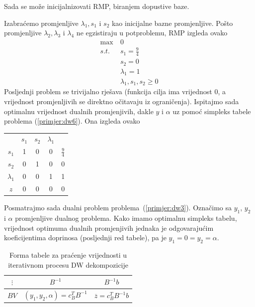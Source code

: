 \documentclass[a4paper, utf8, 11pt, colorlinks]{book}
\theoremstyle{definition}
\begin{document}
Sada se može inicijalnizovati RMP, biranjem dopustive baze.

Izabraćemo promjenljive $\lambda_1, s_1$ i $s_2$ kao inicijalne bazne promjenljive. Pošto  promjenljive $\lambda_2,\lambda_3$ i $\lambda_4$ ne egzistiraju u potproblemu,  RMP izgleda ovako
      \begin{equation}
	\begin{aligned}\label{primjer:dw6}
		\max\  & 0\\
		s.t.\  &s_1=\frac 94\\
		&s_2=0\\
		&\lambda_1 = 1\\
		&\lambda_1,s_1,s_2\geqslant 0
	\end{aligned}
\end{equation}
Posljednji problem se trivijalno rješava (funkcija cilja ima vrijednost 0, a vrijednost promjenljivih se direktno očitavaju iz ograničenja). Ispitajmo sada optimalnu vrijednost dualnih promjenjivih, dakle $y$ i $\alpha$ uz pomoć simpleks tabele problema (\ref{primjer:dw6}). Ona izgleda ovako
\begin{center}

\begin{tabular}{c|cccc}
	       &$s_1$  & $ s_2$   & $\lambda_1$ &  \\
 $s_1$	   &  1  &   0      &   0         &  $\frac{9}{4}$ \\
  $s_2$	  &  0  &    1     &   0         &  0             \\
$\lambda_1$	  &  0  &    0     &   1         &  1   \\ \hline
	$z$   & 0  &    0     &   0         &  0
\end{tabular}
\end{center}
 
Posmatrajmo sada dualni problem problema~(\ref{primjer:dw3}). Označimo sa $y_1$, $y_2$ i $\alpha$ promjenljive dualnog problema. Kako imamo optimalnu simpleks tabelu, vrijednost optimuma dualnih promjenjivih jednaka je odgovarajućim koeficijentima doprinosa (posljednji red tabele), pa je $y_1 = 0 = y_2 = \alpha$. 

\begin{table}\centering
	\begin{tabular}{|c|c|c|} \hline
	$\vdots$ & 	$B^{-1}$& $B^{-1}b$ \\
	\hline
	$BV$ &	$(y_1,y_2,\alpha)=c^T_B B^{-1}$ & $\overline{z}= c^T_B B^{-1}b$ \\	
		\hline
	\end{tabular}\caption{Forma tabele za praćenje vrijednosti u iterativnom procesu DW dekompozicije}\label{tbl:dw1}
\end{table}
\end{document}
